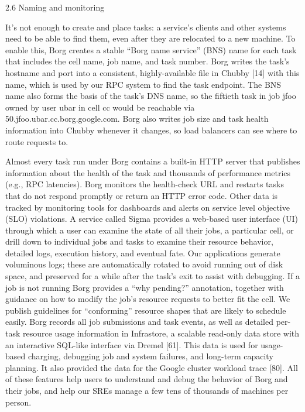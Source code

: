 2.6 Naming and monitoring

It’s not enough to create and place tasks: a service’s clients
and other systems need to be able to find them, even after
they are relocated to a new machine. To enable this, Borg
creates a stable “Borg name service” (BNS) name for each
task that includes the cell name, job name, and task number.
Borg writes the task’s hostname and port into a consistent,
highly-available file in Chubby [14] with this name, which
is used by our RPC system to find the task endpoint. The
BNS name also forms the basis of the task’s DNS name,
so the fiftieth task in job jfoo owned by user ubar in cell
cc would be reachable via 50.jfoo.ubar.cc.borg.google.com.
Borg also writes job size and task health information into
Chubby whenever it changes, so load balancers can see
where to route requests to.


Almost every task run under Borg contains a built-in
HTTP server that publishes information about the health of
the task and thousands of performance metrics (e.g., RPC
latencies). Borg monitors the health-check URL and restarts
tasks that do not respond promptly or return an HTTP error code. Other data is tracked by monitoring tools for dashboards and alerts on service level objective (SLO) violations.
A service called Sigma provides a web-based user interface (UI) through which a user can examine the state of all
their jobs, a particular cell, or drill down to individual jobs
and tasks to examine their resource behavior, detailed logs,
execution history, and eventual fate. Our applications generate voluminous logs; these are automatically rotated to avoid
running out of disk space, and preserved for a while after the
task’s exit to assist with debugging. If a job is not running
Borg provides a “why pending?” annotation, together with
guidance on how to modify the job’s resource requests to
better fit the cell. We publish guidelines for “conforming”
resource shapes that are likely to schedule easily.
Borg records all job submissions and task events, as well
as detailed per-task resource usage information in Infrastore,
a scalable read-only data store with an interactive SQL-like
interface via Dremel [61]. This data is used for usage-based
charging, debugging job and system failures, and long-term
capacity planning. It also provided the data for the Google
cluster workload trace [80].
All of these features help users to understand and debug
the behavior of Borg and their jobs, and help our SREs
manage a few tens of thousands of machines per person.

